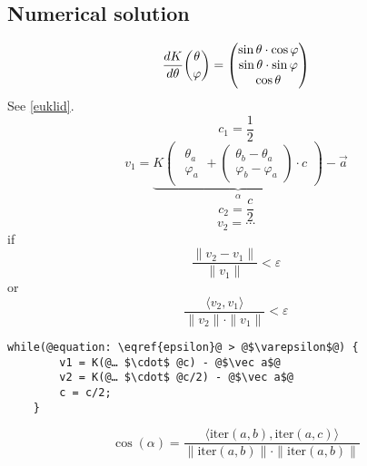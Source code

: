 \subsection{Numerical solution}
\begin{equation}
    \frac{dK}{d\theta}\dbinom{\theta}{\varphi}=
    \begin{pmatrix}
        \sin\theta\cdot\cos\varphi \\
        \sin\theta\cdot\sin\varphi \\
        \cos\theta
    \end{pmatrix}
\end{equation}
See \eqref{euklid}.
\begin{equation}
    c_1=\frac{1}{2}
\end{equation}
\begin{equation}
    v_1=\underbrace{K
    \begin{pmatrix}
        \begin{matrix}
            \theta_a \\
            \varphi_a
        \end{matrix}
        +
        \begin{pmatrix}
            \theta_b-\theta_a\\
            \varphi_b-\varphi_a
        \end{pmatrix}
        \cdot c
    \end{pmatrix}
    }_{\alpha}
    -\vec{a}
\end{equation}
\begin{equation}
    c_2=\frac{c}{2}
\end{equation}
\begin{equation}
    v_2=\cdots
\end{equation}
if
\begin{equation}\label{epsilon}
    \frac{\|v_2-v_1\|}{\|v_1\|}<\varepsilon
\end{equation}
or
\begin{equation}
    \frac{\langle v_2, v_1\rangle}{\|v_2\|\cdot\|v_1\|}<\varepsilon
\end{equation}
\begin{lstlisting}[escapechar=@]
    while(@equation: \eqref{epsilon}@ > @$\varepsilon$@) {
        v1 = K(@… $\cdot$ @c) - @$\vec a$@
        v2 = K(@… $\cdot$ @c/2) - @$\vec a$@
        c = c/2;
    }
\end{lstlisting}
\begin{equation}
    \cos(\alpha)=\frac{\langle\mathrm{iter}(a,b), \mathrm{iter}(a,c)\rangle}{\|\mathrm{iter}(a,b)\|\cdot \|\mathrm{iter}(a,b)\|}
\end{equation}